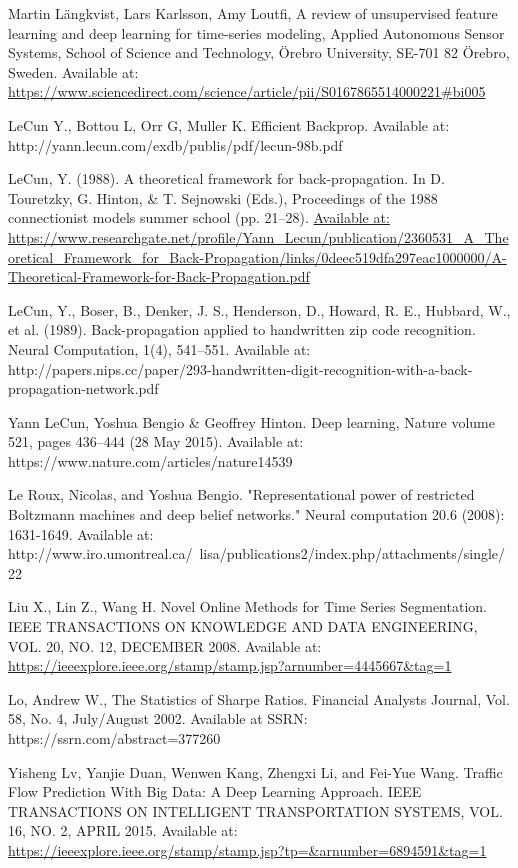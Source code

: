 \documentclass[a4paper,latin]{paper}
\begin{document}
\begin{thebibliography}{bibliography}
Martin Längkvist, Lars Karlsson,  Amy Loutfi, A review of unsupervised feature learning and deep learning for time-series 
modeling, Applied Autonomous Sensor Systems, School of Science and Technology, Örebro University, SE-701 82 Örebro, 
Sweden. Available at: \url{https://www.sciencedirect.com/science/article/pii/S0167865514000221#bi005}

LeCun Y., Bottou L, Orr G, Muller K. Efficient Backprop. Available at: http://yann.lecun.com/exdb/publis/pdf/lecun-98b.pdf

LeCun, Y. (1988). A theoretical framework for back-propagation. In D. Touretzky,
G. Hinton, \& T. Sejnowski (Eds.), Proceedings of the 1988 connectionist models summer school (pp. 21–28).
\url{Available at: https://www.researchgate.net/profile/Yann_Lecun/publication/2360531_A_Theoretical_Framework_for_Back-Propagation/links/0deec519dfa297eac1000000/A-Theoretical-Framework-for-Back-Propagation.pdf}

LeCun, Y., Boser, B., Denker, J. S., Henderson, D., Howard, R. E., Hubbard, W., et al.
(1989). Back-propagation applied to handwritten zip code recognition. Neural
Computation, 1(4), 541–551. Available at: http://papers.nips.cc/paper/293-handwritten-digit-recognition-with-a-back-propagation-network.pdf

Yann LeCun, Yoshua Bengio \& Geoffrey Hinton. Deep learning, Nature volume 521, pages 436–444 (28 May 
2015). Available at: https://www.nature.com/articles/nature14539

Le Roux, Nicolas, and Yoshua Bengio. "Representational power of restricted Boltzmann machines and deep belief networks." Neural computation 20.6 (2008): 1631-1649.
Available at: http://www.iro.umontreal.ca/~lisa/publications2/index.php/attachments/single/22

Liu X., Lin Z., Wang H. Novel Online Methods for Time Series Segmentation.  IEEE TRANSACTIONS ON KNOWLEDGE AND DATA ENGINEERING, VOL. 20, NO. 12, DECEMBER 
2008. Available at: \url{https://ieeexplore.ieee.org/stamp/stamp.jsp?arnumber=4445667&tag=1}

Lo, Andrew W., The Statistics of Sharpe Ratios. Financial Analysts Journal, Vol. 58, No. 4, July/August 2002. Available at SSRN: https://ssrn.com/abstract=377260

Yisheng Lv, Yanjie Duan, Wenwen Kang, Zhengxi Li, and Fei-Yue Wang. Traffic Flow Prediction With Big Data:
A Deep Learning Approach. IEEE TRANSACTIONS ON INTELLIGENT TRANSPORTATION SYSTEMS, VOL. 16, NO. 2, APRIL 
2015. Available at: \url{https://ieeexplore.ieee.org/stamp/stamp.jsp?tp=&arnumber=6894591&tag=1}


\end{thebibliography}
\end{document}
